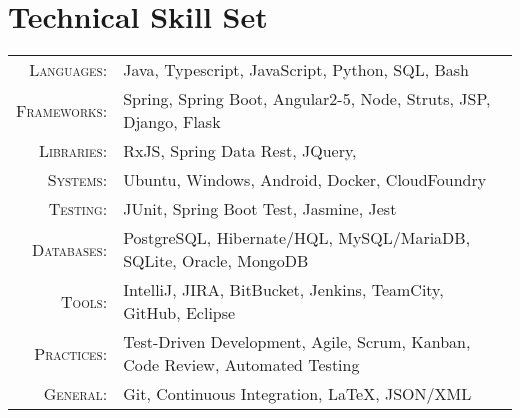 \section{Technical Skill Set}

\begin{tabular}{r|p{11cm}}
	\textsc{Languages}: & Java, Typescript, JavaScript, Python, SQL, Bash \\
	\textsc{Frameworks}: & Spring, Spring Boot, Angular2-5, Node, Struts, JSP, Django, Flask \\
	\textsc{Libraries}: & RxJS, Spring Data Rest, JQuery,  \\
	\textsc{Systems}: & Ubuntu, Windows, Android, Docker, CloudFoundry \\
	\textsc{Testing}: & JUnit, Spring Boot Test, Jasmine, Jest \\
	\textsc{Databases}: & PostgreSQL, Hibernate/HQL, MySQL/MariaDB, SQLite, Oracle, MongoDB \\
	\textsc{Tools}: & IntelliJ, JIRA, BitBucket, Jenkins, TeamCity, GitHub, Eclipse \\
	\textsc{Practices}: & Test-Driven Development, Agile, Scrum, Kanban, Code Review, Automated Testing \\
	\textsc{General}: & Git, Continuous Integration, LaTeX, JSON/XML  \\
\end{tabular}
